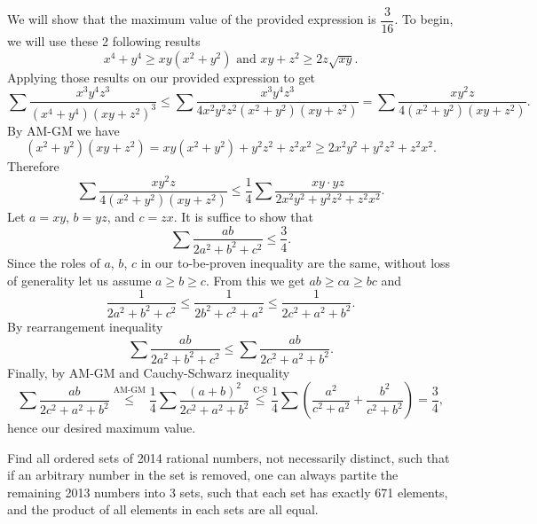 \documentclass[11pt]{article}
\begin{document}
        \begin{solution}
            We will show that the maximum value of the provided expression is \(\dfrac{3}{16}\). To begin, we will use these 2 following results
            \[x^4 + y^4 \geq xy(x^2 + y^2) \text{\ \ and \ } xy + z^2 \geq 2z\sqrt{xy}.\]
            Applying those results on our provided expression to get
            \[\sum \frac{x^3y^4z^3}{(x^4 + y^4)(xy + z^2)^3} \leq \sum \frac{x^3y^4z^3}{4x^2y^2z^2(x^2 + y^2)(xy + z^2)} = \sum \frac{xy^2z}{4(x^2 + y^2)(xy + z^2)}.\]
            By AM-GM we have
            \[(x^2 + y^2)(xy + z^2) = xy(x^2 + y^2) + y^2z^2 + z^2x^2 \geq 2x^2y^2 + y^2z^2 + z^2x^2.\]
            Therefore
            \[\sum \frac{xy^2z}{4(x^2 + y^2)(xy + z^2)} \leq \frac{1}{4} \sum \frac{xy \cdot yz}{2x^2y^2 + y^2z^2 + z^2x^2}.\]
            Let \(a = xy\), \(b = yz\), and \(c = zx\). It is suffice to show that
            \[\sum \frac{ab}{2a^2 + b^2 + c^2} \leq \frac{3}{4}.\]
            Since the roles of \(a\), \(b\), \(c\) in our to-be-proven inequality are the same, without loss of generality let us assume \(a \geq b \geq c\). From this we get \(ab \geq ca \geq bc\) and
            \[\frac{1}{2a^2 + b^2 + c^2} \leq \frac{1}{2b^2 + c^2 + a^2} \leq \frac{1}{2c^2 + a^2 + b^2}.\]
            By rearrangement inequality
            \[\sum \frac{ab}{2a^2 + b^2 + c^2} \leq \sum \frac{ab}{2c^2 + a^2 + b^2}.\]
            Finally, by AM-GM and Cauchy-Schwarz inequality
            \[\sum \frac{ab}{2c^2 + a^2 + b^2} \stackrel{\text{AM-GM}}{\leq} \frac{1}{4} \sum \frac{(a + b)^2}{2c^2 + a^2 + b^2} \stackrel{\text{C-S}}{\leq} \frac{1}{4} \sum \left( \frac{a^2}{c^2 + a^2} + \frac{b^2}{c^2 + b^2} \right) = \frac{3}{4},\]
            hence our desired maximum value.
        \end{solution}

        \newpage

        \begin{problem}
            Find all ordered sets of 2014 rational numbers, not necessarily distinct, such that if an arbitrary number in the set is removed, one can always partite the remaining 2013 numbers into 3 sets, such that each set has exactly 671 elements, and the product of all elements in each sets are all equal.
        \end{problem}
\end{document}
